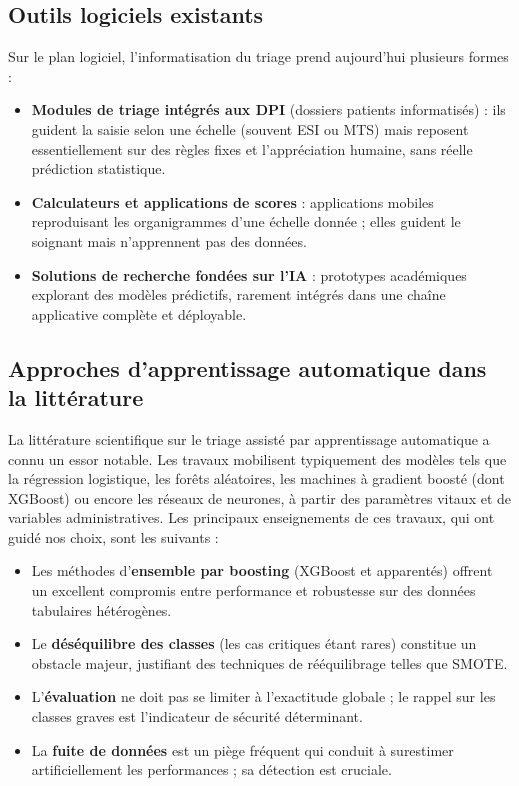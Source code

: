 \subsection{Outils logiciels existants}
Sur le plan logiciel, l'informatisation du triage prend aujourd'hui plusieurs formes :
\begin{itemize}
  \item \textbf{Modules de triage intégrés aux DPI} (dossiers patients informatisés) : ils
  guident la saisie selon une échelle (souvent ESI ou MTS) mais reposent essentiellement sur
  des règles fixes et l'appréciation humaine, sans réelle prédiction statistique.
  \item \textbf{Calculateurs et applications de scores} : applications mobiles reproduisant
  les organigrammes d'une échelle donnée ; elles guident le soignant mais n'apprennent pas
  des données.
  \item \textbf{Solutions de recherche fondées sur l'IA} : prototypes académiques explorant
  des modèles prédictifs, rarement intégrés dans une chaîne applicative complète et
  déployable.
\end{itemize}

\subsection{Approches d'apprentissage automatique dans la littérature}
La littérature scientifique sur le triage assisté par apprentissage automatique a connu un
essor notable. Les travaux mobilisent typiquement des modèles tels que la régression
logistique, les forêts aléatoires, les machines à gradient boosté (dont XGBoost) ou encore
les réseaux de neurones, à partir des paramètres vitaux et de variables administratives. Les
principaux enseignements de ces travaux, qui ont guidé nos choix, sont les suivants :
\begin{itemize}
  \item Les méthodes d'\textbf{ensemble par boosting} (XGBoost et apparentés) offrent un
  excellent compromis entre performance et robustesse sur des données tabulaires
  hétérogènes.
  \item Le \textbf{déséquilibre des classes} (les cas critiques étant rares) constitue un
  obstacle majeur, justifiant des techniques de rééquilibrage telles que SMOTE.
  \item L'\textbf{évaluation} ne doit pas se limiter à l'exactitude globale ; le rappel sur
  les classes graves est l'indicateur de sécurité déterminant.
  \item La \textbf{fuite de données} est un piège fréquent qui conduit à surestimer
  artificiellement les performances ; sa détection est cruciale.
\end{itemize}

